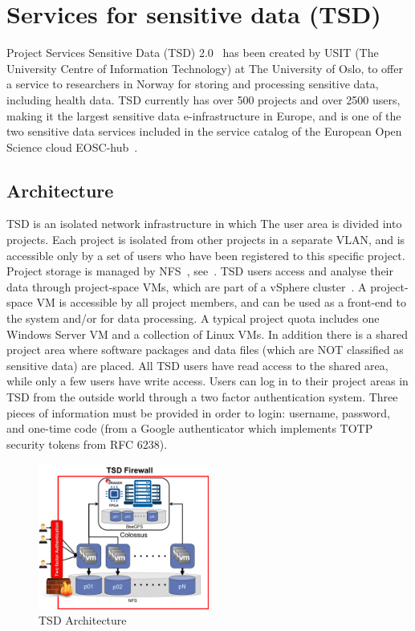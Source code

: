 \section{Services for sensitive data (TSD)}
\label{sec:tsd}
Project Services Sensitive Data (TSD) 2.0~\cite{tsd} has been created by USIT (The University Centre of Information Technology) at The University of Oslo, to offer a service to researchers in Norway for storing and processing sensitive data, including health data. TSD currently has over 500 projects and over 2500 users, making it the largest sensitive data e-infrastructure in Europe, and is one of the two sensitive data services included in  the service catalog of the European Open Science cloud EOSC-hub~\cite{eosc-hub}.

\subsection{Architecture}
\label{subsec:arch}
TSD is an isolated network infrastructure in which The user area is divided into projects. Each project is isolated from other projects in a separate VLAN, and is accessible only by a set of users who have been registered to this specific project. Project storage is managed by NFS~\cite{nfs}, see~. TSD users access and analyse their data through project-space VMs, which are part of a vSphere cluster~\cite{vsphere}. A project-space VM is accessible by all project members, and can be used as a front-end to the system and/or for data processing. A typical project quota includes one Windows Server VM and a collection of Linux VMs. In addition there is a shared project area where software packages and data files (which are NOT classified as sensitive data) are placed. All TSD users have read access to the shared area, while only a few users have write access. Users can log in to their project areas in TSD from the outside world through a two factor authentication system. Three pieces of information must be provided in order to login: username, password, and one-time code (from a Google authenticator which implements TOTP security tokens from RFC 6238).

\begin{figure}[htbp]
	\centering
	\includegraphics[width=0.5\textwidth]{figures/tsd-arch}                
	\caption{TSD Architecture}
	\label{fig:tsd-arch}
\end{figure}

